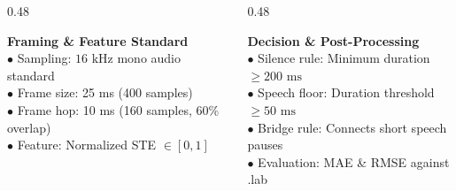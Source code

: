 \documentclass[aspectratio=169, 10pt]{beamer}
\begin{document}
\begin{frame}
\begin{tcolorbox}[contentframe]
  \vspace{6pt}
  \begin{columns}[T]
    \begin{column}{0.48\textwidth}
      \begin{tcolorbox}[darkcard, height=3.05cm, valign=top]
        {\fontsize{9pt}{10pt}\selectfont\color{cyanGlow}\textbf{Framing \& Feature Standard}}\\[4pt]
        {\fontsize{8pt}{10.5pt}\selectfont
        $\bullet$ Sampling: $16\text{ kHz}$ mono audio standard\\[3pt]
        $\bullet$ Frame size: 25 ms (400 samples)\\[3pt]
        $\bullet$ Frame hop: 10 ms (160 samples, 60\% overlap)\\[3pt]
        $\bullet$ Feature: Normalized STE $\in [0, 1]$}
      \end{tcolorbox}
    \end{column}

    \begin{column}{0.48\textwidth}
      \begin{tcolorbox}[darkcard, height=3.05cm, valign=top]
        {\fontsize{9pt}{10pt}\selectfont\color{cyanGlow}\textbf{Decision \& Post-Processing}}\\[4pt]
        {\fontsize{8pt}{10.5pt}\selectfont
        $\bullet$ Silence rule: Minimum duration $\ge 200\text{ ms}$\\[3pt]
        $\bullet$ Speech floor: Duration threshold $\ge 50\text{ ms}$\\[3pt]
        $\bullet$ Bridge rule: Connects short speech pauses\\[3pt]
        $\bullet$ Evaluation: MAE \& RMSE against .lab}
      \end{tcolorbox}
    \end{column}
  \end{columns}
  \end{tcolorbox}
\end{frame}

\end{document}

